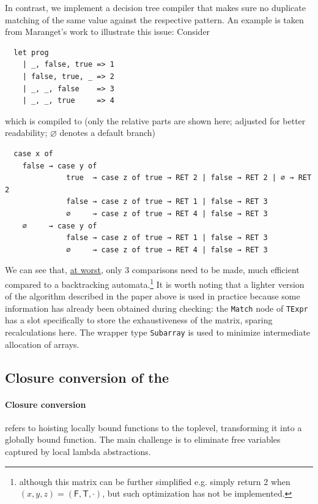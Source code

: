 \documentclass[a4paper, 11pt]{article}
\theoremstyle{remark}\newtheorem*{remark}{Remark}
\theoremstyle{definition}\newtheorem*{definition}{Definition}
\begin{document}
In contrast, we implement a decision tree compiler that makes sure no duplicate matching of the same value against the respective pattern. An example is taken from Maranget's work to illustrate this issue:
Consider

\begin{verbatim}
  let prog
    | _, false, true => 1
    | false, true, _ => 2
    | _, _, false    => 3
    | _, _, true     => 4
\end{verbatim}

which is compiled to (only the relative parts are shown here; adjusted for better readability; $\varnothing$ denotes a default branch)

\begin{verbatim}
  case x of
    false → case y of
              true  → case z of true → RET 2 | false → RET 2 | ∅ → RET 2
              false → case z of true → RET 1 | false → RET 3
              ∅     → case z of true → RET 4 | false → RET 3
    ∅     → case y of
              false → case z of true → RET 1 | false → RET 3
              ∅     → case z of true → RET 4 | false → RET 3
\end{verbatim}

We can see that, \underline{at worst}, only 3 comparisons need to be made,
much efficient compared to a backtracking automata.\footnote{
although this matrix can be further simplified e.g. simply return 2 when
$(x,y,z) = (\mathsf{F},\mathsf{T},\cdot)$,
but such optimization has not be implemented.
}
It is worth noting that a lighter version of the algorithm described in the paper above
is used in practice
because some information has already been obtained during checking: the \texttt{Match} node
of \texttt{TExpr} has a slot specifically to store the exhaustiveness of the matrix,
sparing recalculations here. The wrapper type \texttt{Subarray} is used to minimize intermediate
allocation of arrays.

\subsection{Closure conversion of the \Lambdair}

\paragraph{Closure conversion} refers to hoisting locally bound functions to the toplevel, transforming
it into a globally bound function. The main challenge is to eliminate free variables captured by local
lambda abstractions.
\end{document}
